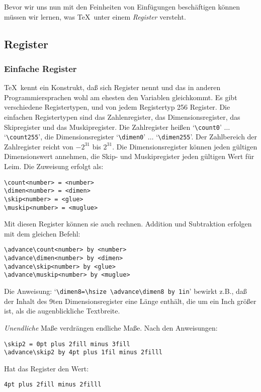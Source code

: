 Bevor wir uns nun mit den Feinheiten von Einf\"ugungen besch\"aftigen
k\"onnen m\"ussen wir lernen, was \TeX\ unter einem 
{\em Register}
versteht.
\subsection{Register}
\subsubsection{Einfache Register}
\TeX\ kennt ein Konstrukt, da\ss{} sich Register nennt und das in anderen
Programmiersprachen wohl am ehesten den Variablen gleichkommt. Es gibt
verschiedene Registertypen, und von jedem Registertyp 256 Register.
Die einfachen Registertypen sind das Zahlenregister, das
Dimensionsregister, das Skipregister und das Muskipregister. Die
Zahlregister hei\ss{}en 
`\verb|\count0|' $\ldots$ `\verb|\count255|', die
Dimensionsregister 
`\verb|\dimen0|' $\ldots$ `\verb|\dimen255|'. Der
Zahlbereich der Zahlregister reicht von $-2^{31}$ bis $2^{31}$. Die
Dimensionsregister k\"onnen jeden g\"ultigen 
Dimensionswert annehmen, die
Skip- und Muskipregister jeden g\"ultigen Wert f\"ur Leim. Die
Zuweisung erfolgt als:
\begin{verbatim}
\count<number> = <number>
\dimen<number> = <dimen>
\skip<number> = <glue>
\muskip<number> = <muglue>
\end{verbatim}
Mit diesen Register k\"onnen sie auch rechnen. Addition und
Subtraktion
erfolgen mit dem gleichen Befehl:
\begin{verbatim}
\advance\count<number> by <number>
\advance\dimen<number> by <dimen>
\advance\skip<number> by <glue>
\advance\muskip<number> by <muglue>
\end{verbatim}
Die Anweisung: 
`\verb|\dimen8=\hsize \advance\dimen8 by 1in|' bewirkt
z.B., da\ss{} der Inhalt des 9ten 
Dimensionsregister eine L\"ange enth\"alt,
die um ein Inch gr\"o\ss{}er ist, als die augenblickliche Textbreite.

{\em Unendliche} 
Ma\ss{}e verdr\"angen endliche Ma\ss{}e. Nach den Anweisungen:
\begin{verbatim}
\skip2 = 0pt plus 2fill minus 3fill
\advance\skip2 by 4pt plus 1fil minus 2filll
\end{verbatim}
Hat das Register den Wert:
\begin{verbatim}
4pt plus 2fill minus 2filll
\end{verbatim}

